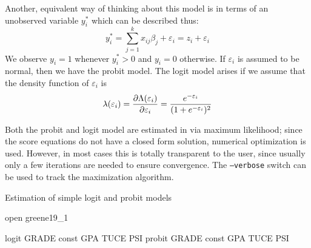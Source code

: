 Another, equivalent way of thinking about this model is in terms of
an unobserved variable $y^*_i$ which can be described thus:
%
\begin{equation}
  \label{eq:qr-latent}
  y^*_i = \sum_{j=1}^k x_{ij} \beta_j + \varepsilon_i = z_i  +
  \varepsilon_i 
\end{equation}
%
We observe $y_i = 1$ whenever $y^*_i > 0$ and $y_i = 0$ otherwise. If
$\varepsilon_i$ is assumed to be normal, then we have the probit
model. The logit model arises if we assume that the density function
of $\varepsilon_i$ is
%
\[
  \lambda(\varepsilon_i) =
  \frac{\partial \Lambda(\varepsilon_i)}{\partial \varepsilon_i} =
  \frac{e^{-\varepsilon_i}}{(1 + e^{-\varepsilon_i})^2}
\]

Both the probit and logit model are estimated in  via
maximum likelihood; since the score equations do not have a closed
form solution, numerical optimization is used. However, in most cases
this is totally transparent to the user, since usually only a few
iterations are needed to ensure convergence. The \texttt{--verbose}
switch can be used to track the maximization algorithm.

\begin{script}[htbp]
  \caption{Estimation of simple logit and probit models}
  \label{simple-QR}
\begin{scode}
open greene19_1

logit GRADE const GPA TUCE PSI
probit GRADE const GPA TUCE PSI
\end{scode}
\end{script}

